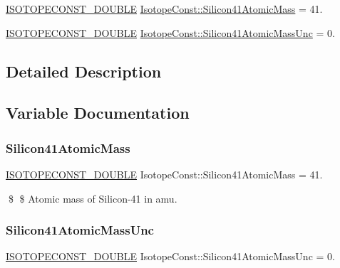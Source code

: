 \begin{DoxyCompactItemize}
\item 
\mbox{\hyperlink{group___isotope_const-_macros_ga8f45a7272ce02c0b4c65c44636ed719a}{I\+S\+O\+T\+O\+P\+E\+C\+O\+N\+S\+T\+\_\+\+D\+O\+U\+B\+LE}} \mbox{\hyperlink{group___isotope_const-_silicon-_si41_ga641b7151078ca7eff54f9452aa4f8f5f}{Isotope\+Const\+::\+Silicon41\+Atomic\+Mass}} = 41.
\item 
\mbox{\hyperlink{group___isotope_const-_macros_ga8f45a7272ce02c0b4c65c44636ed719a}{I\+S\+O\+T\+O\+P\+E\+C\+O\+N\+S\+T\+\_\+\+D\+O\+U\+B\+LE}} \mbox{\hyperlink{group___isotope_const-_silicon-_si41_ga4cd5a941905210c338df65fcb06f2d1c}{Isotope\+Const\+::\+Silicon41\+Atomic\+Mass\+Unc}} = 0.
\end{DoxyCompactItemize}


\subsection{Detailed Description}


\subsection{Variable Documentation}
\mbox{\label{group___isotope_const-_silicon-_si41_ga641b7151078ca7eff54f9452aa4f8f5f}} 
\subsubsection{\texorpdfstring{Silicon41\+Atomic\+Mass}{Silicon41AtomicMass}}
{\footnotesize\ttfamily \mbox{\hyperlink{group___isotope_const-_macros_ga8f45a7272ce02c0b4c65c44636ed719a}{I\+S\+O\+T\+O\+P\+E\+C\+O\+N\+S\+T\+\_\+\+D\+O\+U\+B\+LE}} Isotope\+Const\+::\+Silicon41\+Atomic\+Mass = 41.}

\$ \$ Atomic mass of Silicon-\/41 in amu. \mbox{\label{group___isotope_const-_silicon-_si41_ga4cd5a941905210c338df65fcb06f2d1c}} 
\subsubsection{\texorpdfstring{Silicon41\+Atomic\+Mass\+Unc}{Silicon41AtomicMassUnc}}
{\footnotesize\ttfamily \mbox{\hyperlink{group___isotope_const-_macros_ga8f45a7272ce02c0b4c65c44636ed719a}{I\+S\+O\+T\+O\+P\+E\+C\+O\+N\+S\+T\+\_\+\+D\+O\+U\+B\+LE}} Isotope\+Const\+::\+Silicon41\+Atomic\+Mass\+Unc = 0.}

